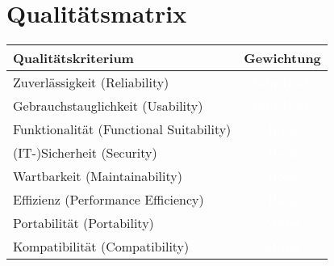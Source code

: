 \section{Qualitätsmatrix}
\begin{center}
    \begin{tabular}{ |l|c| }

        \hline
        \textbf{Qualitätskriterium} & \textbf{Gewichtung}  \\ \hline
        Zuverlässigkeit (Reliability) & \cellcolor[HTML]{120a8f} \textcolor{white}{Sehr Hoch}\\ 
        Gebrauchstauglichkeit (Usability) & \cellcolor[HTML]{120a8f} \textcolor{white}{Sehr Hoch}\\ 
        Funktionalität (Functional Suitability) & \cellcolor[HTML]{1f11ee} \textcolor{white}{Hoch}\\ 
        (IT-)Sicherheit (Security) & \cellcolor[HTML]{1f11ee} \textcolor{white}{Hoch}\\ 
        Wartbarkeit (Maintainability) & \cellcolor[HTML]{1f11ee} \textcolor{white}{Hoch}\\ 
        Effizienz (Performance Efficiency) & \cellcolor[HTML]{1f11ee} \textcolor{white}{Hoch}\\ 
        Portabilität (Portability) & \cellcolor[HTML]{7970f5} \textcolor{white}{Mittel}\\ 
        Kompatibilität (Compatibility) & \cellcolor[HTML]{7970f5} \textcolor{white}{Mittel}
        \\ \hline
        \end{tabular}
    \end{center}